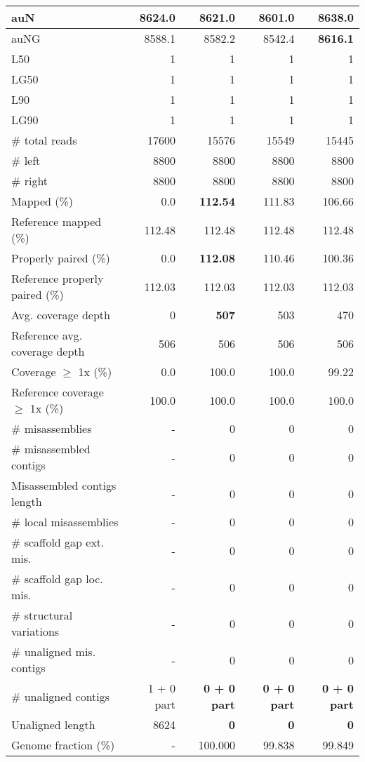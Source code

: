 \documentclass[12pt,a4paper]{article}
\begin{document}
\begin{table}[ht]
\begin{center}
\begin{tabular}{|l*{4}{|r}|}
auN & 8624.0 & 8621.0 & 8601.0 & {\bf 8638.0} \\ \hline
auNG & 8588.1 & 8582.2 & 8542.4 & {\bf 8616.1} \\ \hline
L50 & 1 & 1 & 1 & 1 \\ \hline
LG50 & 1 & 1 & 1 & 1 \\ \hline
L90 & 1 & 1 & 1 & 1 \\ \hline
LG90 & 1 & 1 & 1 & 1 \\ \hline
\# total reads & 17600 & 15576 & 15549 & 15445 \\ \hline
\# left & 8800 & 8800 & 8800 & 8800 \\ \hline
\# right & 8800 & 8800 & 8800 & 8800 \\ \hline
Mapped (\%) & 0.0 & {\bf 112.54} & 111.83 & 106.66 \\ \hline
Reference mapped (\%) & 112.48 & 112.48 & 112.48 & 112.48 \\ \hline
Properly paired (\%) & 0.0 & {\bf 112.08} & 110.46 & 100.36 \\ \hline
Reference properly paired (\%) & 112.03 & 112.03 & 112.03 & 112.03 \\ \hline
Avg. coverage depth & 0 & {\bf 507} & 503 & 470 \\ \hline
Reference avg. coverage depth & 506 & 506 & 506 & 506 \\ \hline
Coverage $\geq$ 1x (\%) & 0.0 & 100.0 & 100.0 & 99.22 \\ \hline
Reference coverage $\geq$ 1x (\%) & 100.0 & 100.0 & 100.0 & 100.0 \\ \hline
\# misassemblies & - & 0 & 0 & 0 \\ \hline
\# misassembled contigs & - & 0 & 0 & 0 \\ \hline
Misassembled contigs length & - & 0 & 0 & 0 \\ \hline
\# local misassemblies & - & 0 & 0 & 0 \\ \hline
\# scaffold gap ext. mis. & - & 0 & 0 & 0 \\ \hline
\# scaffold gap loc. mis. & - & 0 & 0 & 0 \\ \hline
\# structural variations & - & 0 & 0 & 0 \\ \hline
\# unaligned mis. contigs & - & 0 & 0 & 0 \\ \hline
\# unaligned contigs & 1 + 0 part & {\bf 0 + 0 part} & {\bf 0 + 0 part} & {\bf 0 + 0 part} \\ \hline
Unaligned length & 8624 & {\bf 0} & {\bf 0} & {\bf 0} \\ \hline
Genome fraction (\%) & - & 100.000 & 99.838 & 99.849 \\ \hline

\end{tabular}
\end{center}
\end{table}
\end{document}
